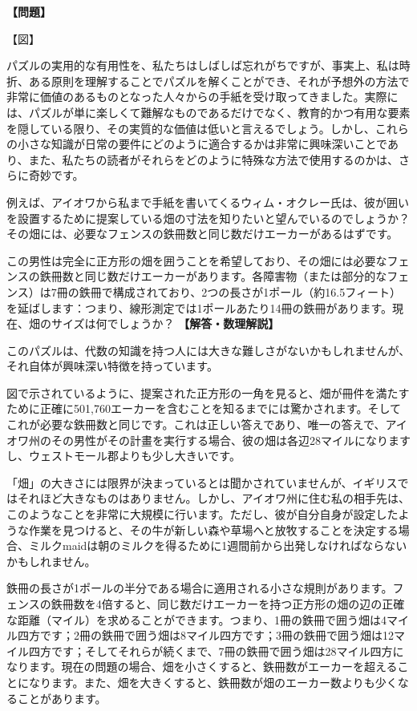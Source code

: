 \documentclass[10pt,a4paper,oneside,openany]{ltjsbook}
\begin{document}
\begin{tcolorbox}[colback=softblue,colframe=primaryblue,title=\textbf{第 117 問：フェンスの問題 （原題: A FENCE PROBLEM.）},arc=2mm,boxrule=1pt,breakable]
\textbf{【問題】}\par\vspace{0.3em}
【図】

パズルの実用的な有用性を、私たちはしばしば忘れがちですが、事実上、私は時折、ある原則を理解することでパズルを解くことができ、それが予想外の方法で非常に価値のあるものとなった人々からの手紙を受け取ってきました。実際には、パズルが単に楽しくて難解なものであるだけでなく、教育的かつ有用な要素を隠している限り、その実質的な価値は低いと言えるでしょう。しかし、これらの小さな知識が日常の要件にどのように適合するかは非常に興味深いことであり、また、私たちの読者がそれらをどのように特殊な方法で使用するのかは、さらに奇妙です。

例えば、アイオワから私まで手紙を書いてくるウィム・オクレー氏は、彼が囲いを設置するために提案している畑の寸法を知りたいと望んでいるのでしょうか？その畑には、必要なフェンスの鉄冊数と同じ数だけエーカーがあるはずです。

この男性は完全に正方形の畑を囲うことを希望しており、その畑には必要なフェンスの鉄冊数と同じ数だけエーカーがあります。各障害物（または部分的なフェンス）は7冊の鉄冊で構成されており、2つの長さが1ポール（約16.5フィート）を延ばします：つまり、線形測定では1ポールあたり14冊の鉄冊があります。現在、畑のサイズは何でしょうか？
\tcblower
\textbf{【解答・数理解説】}\par\vspace{0.3em}
このパズルは、代数の知識を持つ人には大きな難しさがないかもしれませんが、それ自体が興味深い特徴を持っています。

図で示されているように、提案された正方形の一角を見ると、畑が冊件を満たすために正確に501,760エーカーを含むことを知るまでには驚かされます。そしてこれが必要な鉄冊数と同じです。これは正しい答えであり、唯一の答えで、アイオワ州のその男性がその計畫を実行する場合、彼の畑は各辺28マイルになりますし、ウェストモール郡よりも少し大きいです。

「畑」の大きさには限界が決まっているとは聞かされていませんが、イギリスではそれほど大きなものはありません。しかし、アイオワ州に住む私の相手先は、このようなことを非常に大規模に行います。ただし、彼が自分自身が設定したような作業を見つけると、その牛が新しい森や草場へと放牧することを決定する場合、ミルクmaidは朝のミルクを得るために1週間前から出発しなければならないかもしれません。

鉄冊の長さが1ポールの半分である場合に適用される小さな規則があります。フェンスの鉄冊数を4倍すると、同じ数だけエーカーを持つ正方形の畑の辺の正確な距離（マイル）を求めることができます。つまり、1冊の鉄冊で囲う畑は4マイル四方です；2冊の鉄冊で囲う畑は8マイル四方です；3冊の鉄冊で囲う畑は12マイル四方です；そしてそれらが続くまで、7冊の鉄冊で囲う畑は28マイル四方になります。現在の問題の場合、畑を小さくすると、鉄冊数がエーカーを超えることになります。また、畑を大きくすると、鉄冊数が畑のエーカー数よりも少くなることがあります。
\end{tcolorbox}
\end{document}
